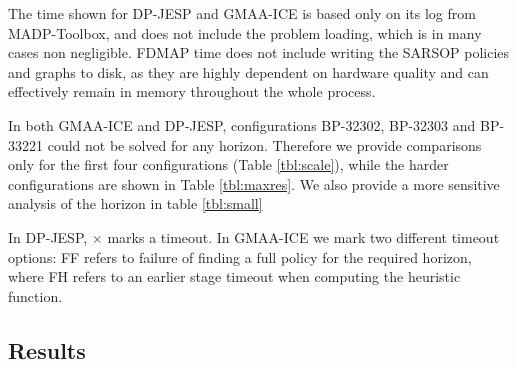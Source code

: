 \documentclass[letterpaper]{article} %
\theoremstyle{definition}
\begin{document}
The time shown for DP-JESP and GMAA-ICE is based only on its log from MADP-Toolbox, and does not include the problem loading, which is in many cases non negligible. FDMAP time does not include writing the SARSOP policies and graphs to disk, as they are highly dependent on hardware quality and can effectively remain in memory throughout the whole process.

In both GMAA-ICE and DP-JESP, configurations BP-32302, BP-32303 and BP-33221 could not be solved for any horizon. Therefore we provide comparisons only for the first four configurations (Table \ref{tbl:scale}), while the harder configurations are shown in Table \ref{tbl:maxres}. We also provide a more sensitive analysis of the horizon in table \ref{tbl:small}

In DP-JESP, $\times$ marks a timeout. In GMAA-ICE we mark two different timeout options: FF refers to failure of finding a full policy for the required horizon, where FH refers to an earlier stage timeout when computing the heuristic function.

\subsection{Results}
\end{document}
